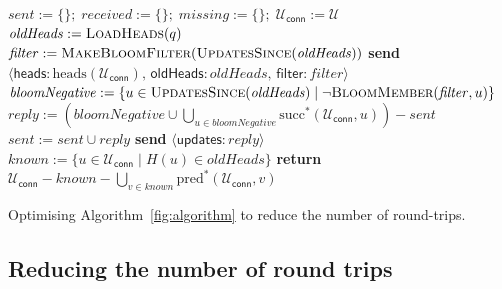 \documentclass[a4paper,anonymous,USenglish]{lipics-v2019}
\begin{document}
\begin{algorithm}[t]
    \begin{algorithmic}[1]
        \State $\mathit{sent} := \{\};\; \mathit{received} := \{\};\; \mathit{missing} := \{\};\; \mathcal{U}_\mathsf{conn} := \mathcal{U}$ 
        \State $\mathit{oldHeads} := \Call{LoadHeads}{q}$\label{line:load-heads}
        \State $\mathit{filter} := \textsc{MakeBloomFilter}(\Call{UpdatesSince}{\mathit{oldHeads}})$\label{line:make-bloom}
        \State \textbf{send} $\langle\mathsf{heads}: \mathrm{heads}(\mathcal{U}_\mathsf{conn}),\, \mathsf{oldHeads}: \mathit{oldHeads},\, \mathsf{filter}: \mathit{filter}\rangle$ \label{line:a2-send-heads}
    \EndOn
    \State
    \label{line:a2-recv-heads}
        \State $\mathit{bloomNegative} := \{u \in \Call{UpdatesSince}{\mathit{oldHeads}} \mid \neg\Call{BloomMember}{\mathit{filter}, u}\}$\label{line:bloom-member}
        \State $\mathit{reply} := \left(\mathit{bloomNegative} \cup \bigcup_{u \in \mathit{bloomNegative}} \mathrm{succ}^*(\mathcal{U}_\mathsf{conn}, u)\right) - \mathit{sent}$\label{line:bloom-succ}
            \State $\mathit{sent} := \mathit{sent} \cup \mathit{reply}$
            \State \textbf{send} $\langle\mathsf{updates}: \mathit{reply}\rangle$ \label{line:a2-heads-reply}
        \EndIf
        \State {} \label{line:a2-heads-missing}
    \EndOn
    \State
        \State $\mathit{known} := \{u \in \mathcal{U}_\mathsf{conn} \mid H(u) \in \mathit{oldHeads}\}$
        \State \textbf{return} $\mathcal{U}_\mathsf{conn} - \mathit{known} - \bigcup_{v \in \mathit{known}} \mathrm{pred}^*(\mathcal{U}_\mathsf{conn}, v)$
    \EndFunction
    \end{algorithmic}
    \caption{Optimising Algorithm~\ref{fig:algorithm} to reduce the number of round-trips.}\label{fig:algorithm2}
\end{algorithm}

\subsection{Reducing the number of round trips}\label{sec:algorithm2}
\end{document}
